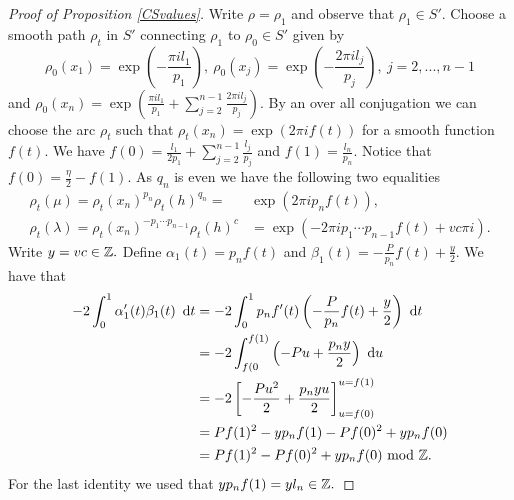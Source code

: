 \begin{proof}[Proof of Proposition \ref{CSvalues}]
 Write $\rho=\rho_1$ and observe that $\rho_1 \in S'$. Choose a smooth path $\rho_t$ in $S'$ connecting $\rho_1$ to $\rho_0 \in S'$ given by
\begin{equation}
\rho_0(x_1)=\exp\left(-\frac{\pi i l_1}{p_1}\right), \ \rho_0(x_j)=\exp\left(-\frac{2\pi i l_j}{p_j}\right), \ j=2,...,n-1
\end{equation} and $\rho_0(x_n)=\exp\left(\frac{\pi i l_1}{p_1}+\sum_{j=2}^{n-1}\frac{2\pi i l_j}{p_j}\right).$ By an over all conjugation we can choose the arc $\rho_t$ such that $\rho_t(x_n)=\exp(2\pi if(t))$ for a smooth function $f(t).$  We have $f(0)=\frac{l_1}{2p_1}+\sum_{j=2}^{n-1} \frac{l_j}{p_j}$ and $ f(1)=\frac{l_n}{p_n}.$ Notice that
$f(0)=\frac{\eta}{2}-f(1).$ As $q_n$ is even we have the following two equalities
\begin{align}
\rho_t(\mu)=\rho_t(x_n)^{p_n}\rho_t(h)^{q_n}=&\exp(2\pi i p_nf(t)),
\\ \rho_t(\lambda)=\rho_t(x_n)^{-p_1\cdots p_{n-1}}\rho_t(h)^c &= \exp\left(-2\pi i p_1\cdots p_{n-1}f(t)+vc\pi i\right).
\end{align}
Write $y=vc\in \mathbb{Z}.$ Define $\alpha_1(t)=p_nf(t)$ and $ \beta_1(t)=-\frac{P}{p_n}f(t)+\frac{y}{2}. $ We have that
\begin{align} \label{firstintegral}\begin{split}
-2 \int_0^1 \alpha'_1(t)\beta_1(t) \ \operatorname{{d}\hskip-.6mm} t&=-2 \int_0^1 p_nf'(t)\left(-\frac{P}{p_n}f(t)+\frac{y}{2}\right) \ \operatorname{{d}\hskip-.6mm} t
\\ &=-2 \int_{f(0}^{f(1)} \left(-Pu+\frac{p_n y}{2}\right) \ \operatorname{{d}\hskip-.6mm} u
\\ &= -2\left[-\frac{Pu^2}{2}+\frac{p_ny u}{2}\right]_{u=f(0)}^{u=f(1)}
\\ &=Pf(1)^2-yp_nf(1)-Pf(0)^2+yp_nf(0)
\\ &= Pf(1)^2-Pf(0)^2+yp_nf(0) \text{ mod } \mathbb{Z}.
\end{split}
\end{align}
For the last identity we used that $yp_nf(1)=yl_n \in \mathbb{Z}.$



\end{proof}
